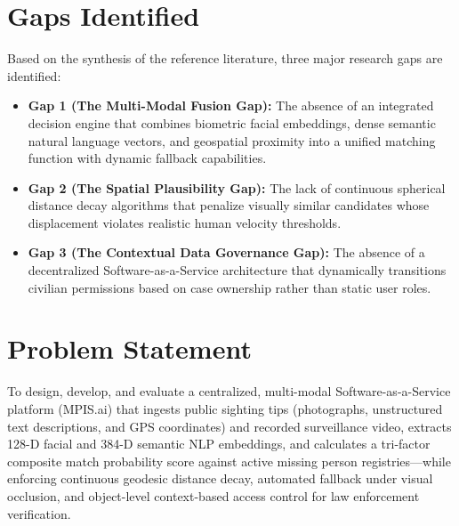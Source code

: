 \documentclass[12pt,a4paper]{report}
\begin{document}
\section{Gaps Identified}
Based on the synthesis of the reference literature, three major research gaps are identified:
\begin{itemize}
    \item \textbf{Gap 1 (The Multi-Modal Fusion Gap):} The absence of an integrated decision engine that combines biometric facial embeddings, dense semantic natural language vectors, and geospatial proximity into a unified matching function with dynamic fallback capabilities.
    \item \textbf{Gap 2 (The Spatial Plausibility Gap):} The lack of continuous spherical distance decay algorithms that penalize visually similar candidates whose displacement violates realistic human velocity thresholds.
    \item \textbf{Gap 3 (The Contextual Data Governance Gap):} The absence of a decentralized Software-as-a-Service architecture that dynamically transitions civilian permissions based on case ownership rather than static user roles.
\end{itemize}

\section{Problem Statement}
To design, develop, and evaluate a centralized, multi-modal Software-as-a-Service platform (MPIS.ai) that ingests public sighting tips (photographs, unstructured text descriptions, and GPS coordinates) and recorded surveillance video, extracts 128-D facial and 384-D semantic NLP embeddings, and calculates a tri-factor composite match probability score against active missing person registries—while enforcing continuous geodesic distance decay, automated fallback under visual occlusion, and object-level context-based access control for law enforcement verification.
\end{document}

